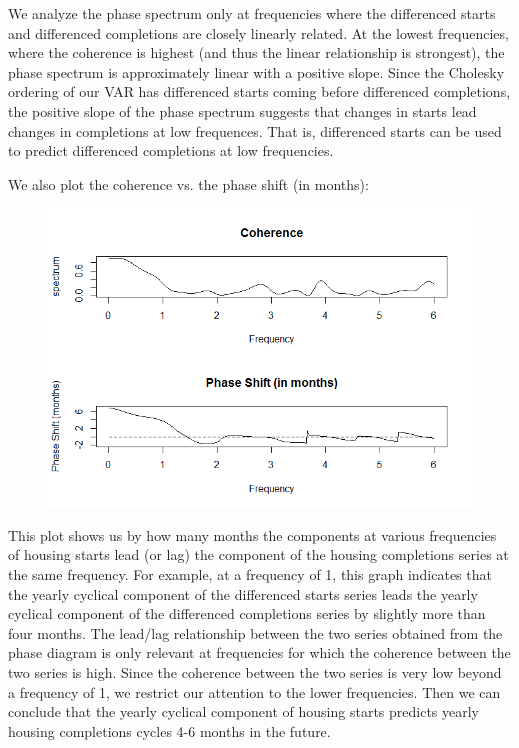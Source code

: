 \documentclass[12pt]{article} %
\begin{document}
We analyze the phase spectrum only at frequencies where the differenced starts and differenced completions are closely linearly related. At the lowest frequencies, where the coherence is highest (and thus the linear relationship is strongest), the phase spectrum is approximately linear with a positive slope. Since the Cholesky ordering of our VAR has differenced starts coming before differenced completions, the positive slope of the phase spectrum suggests that changes in starts lead changes in completions at low frequences. That is, differenced starts can be used to predict differenced completions at low frequencies. 

We also plot the coherence vs. the phase shift (in months):

\begin{figure}[H]
\begin{center}
\includegraphics[scale=0.55]{coherence_phase_shift}
\caption{}
\end{center}
\end{figure}

This plot shows us by how many months the components at various frequencies of housing starts lead (or lag) the component of the housing completions series at the same frequency. For example, at a frequency of 1, this graph indicates that the yearly cyclical component of the differenced starts series leads the yearly cyclical component of the differenced completions series by slightly more than four months. The lead/lag relationship between the two series obtained from the phase diagram is only relevant at frequencies for which the coherence between the two series is high. Since the coherence between the two series is very low beyond a frequency of 1, we restrict our attention to the lower frequencies. Then we can conclude that the yearly cyclical component of housing starts predicts yearly housing completions cycles 4-6 months in the future.
\end{document}
